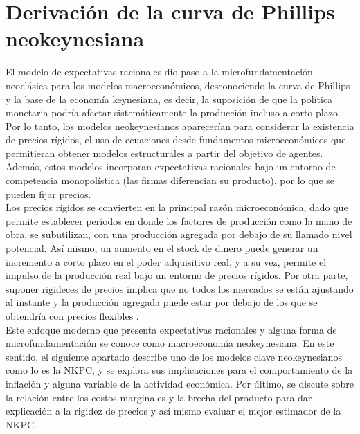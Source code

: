 \section{Derivación de la curva de Phillips neokeynesiana}\label{sec2}
El modelo de expectativas racionales  \citep{lucas1976econometric,sargent1976rational} dio paso a la microfundamentación neoclásica para los modelos macroeconómicos, desconociendo la curva de Phillips y la base de la economía keynesiana, es decir, la suposición de que la política monetaria podría afectar sistemáticamente la producción incluso a corto plazo. Por lo tanto,  los modelos neokeynesianos aparecerían para considerar la existencia de precios rígidos, el uso de ecuaciones desde fundamentos microeconómicos que  permitieran obtener modelos estructurales a partir del objetivo de agentes. Además, estos modelos incorporan expectativas racionales bajo un entorno de competencia monopolística (las firmas diferencian su producto), por lo que se pueden fijar precios.\\

Los precios rígidos se convierten en la principal razón microeconómica, dado que permite establecer períodos en donde los factores de producción como la mano de obra, se subutilizan, con una producción agregada por debajo de su llamado nivel potencial. Así mismo, un aumento en el stock de dinero puede generar un incremento a corto plazo en el poder adquisitivo real, y a su vez, permite el impulso de la producción real bajo un entorno de precios rígidos. Por otra parte, suponer rigideces de precios implica que no todos los mercados se están ajustando al instante y la producción agregada puede estar por debajo de los que se obtendría con precios flexibles  \citep{ball1988new} .\\

Este enfoque moderno que presenta expectativas racionales y alguna forma de microfundamentación se conoce como macroeconomía neokeynesiana. En este sentido, el siguiente apartado describe uno de los modelos clave neokeynesianos como lo es la NKPC, y se explora sus implicaciones para el comportamiento de la inflación y alguna variable de la actividad económica. Por último, se discute sobre la relación entre los costos marginales y la brecha del producto para dar explicación a la rigidez de precios y así mismo evaluar el mejor estimador de la NKPC.

